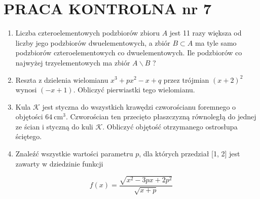 \documentclass[10pt]{article}
\begin{document}
\section*{PRACA KONTROLNA nr 7}
\begin{enumerate}
  \item Liczba czteroelementowych podzbiorów zbioru $A$ jest 11 razy większa od liczby jego podzbiorów dwuelementowych, a zbiór $B \subset A$ ma tyle samo podzbiorów czteroelementowych co dwuelementowych. Ile podzbiorów co najwyżej trzyelementowych ma zbiór $A \backslash B$ ?
  \item Reszta z dzielenia wielomianu $x^{3}+p x^{2}-x+q$ przez trójmian $(x+2)^{2}$ wynosi $(-x+1)$. Obliczyć pierwiastki tego wielomianu.
  \item Kula $\mathcal{K}$ jest styczna do wszystkich krawędzi czworościanu foremnego o objętości $64 \mathrm{~cm}^{3}$. Czworościan ten przecięto płaszczyzną równoległą do jednej ze ścian i styczną do kuli $\mathcal{K}$. Obliczyć objętość otrzymanego ostrosłupa ściętego.
  \item Znaleźć wszystkie wartości parametru $p$, dla których przedział [1, 2] jest zawarty w dziedzinie funkcji
\end{enumerate}

$$
f(x)=\frac{\sqrt{x^{2}-3 p x+2 p^{2}}}{\sqrt{x+p}}
$$
\end{document}
